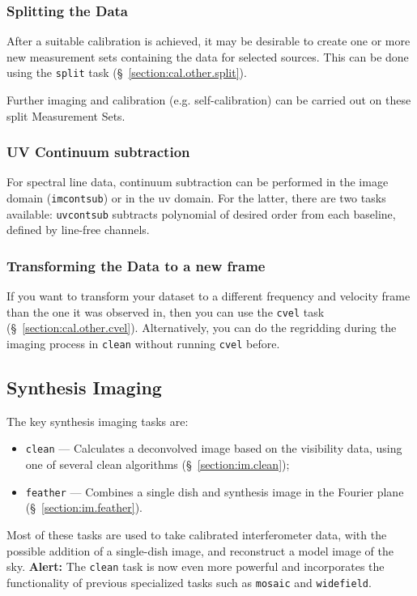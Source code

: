  

\subsubsection{Splitting the Data}
\label{section:intro.walkthru.calib.split}

After a suitable calibration is achieved, it may be desirable to
create one or more new measurement sets containing the data for
selected sources.  This can be done using the {\tt split} task
(\S~\ref{section:cal.other.split}).

Further imaging and calibration (e.g. self-calibration) can be
carried out on these split Measurement Sets.


\subsubsection{UV Continuum subtraction}
\label{section:intro.walkthru.calib.uvcontsub}

For spectral line data, continuum subtraction can be performed in the
image domain ({\tt imcontsub}) or in the uv domain. For the latter,
there are two tasks available: {\tt uvcontsub} subtracts polynomial of
desired order from each baseline, defined by line-free channels. 


\subsubsection{Transforming the Data to a new frame}
\label{section:intro.walkthru.calib.cvel}

If you want to transform your dataset to a different frequency and
velocity frame than the one it was observed in, then you can use
the {\tt cvel} task
(\S~\ref{section:cal.other.cvel}). Alternatively, you can do the
regridding during the imaging process in {\tt clean} without running
{\tt cvel} before.


\subsection{Synthesis Imaging}
\label{section:intro.walkthru.image}

The key synthesis imaging tasks are:
\begin{itemize}
   \item {\tt clean} --- Calculates a deconvolved image based on the visibility
         data, using one of several clean algorithms  
         (\S~\ref{section:im.clean});
   \item {\tt feather} --- Combines a single dish and synthesis image in the
         Fourier plane (\S~\ref{section:im.feather}).
\end{itemize}
Most of these tasks are used to take calibrated interferometer data, with the
possible addition of a single-dish image, and reconstruct a model
image of the sky. {\bf Alert:} The {\tt clean} task is now even more
powerful and incorporates the functionality of previous specialized
tasks such as {\tt mosaic} and {\tt widefield}.

